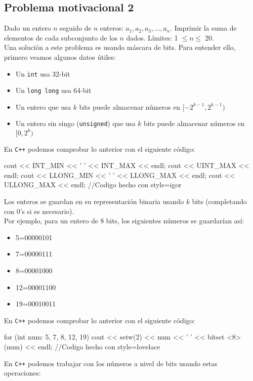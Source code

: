 \documentclass[a4paper,11pt]{article}
\begin{document}
\subsection*{Problema motivacional 2}
Dado un entero $n$ seguido de $n$ enteros: $a_{1}, a_{2}, a_{3}, \ldots, a_{n}$.$\!$ Imprimir la suma de elementos de cada subconjunto de los $n$ dados. Límites: 1 $\leq n \leq$ 20.\\[20pt]
Una solución a este problema es usando máscara de bits. Para entender ello, primero veamos algunos datos útiles:
\begin{itemize}
\item Un \texttt{int} usa 32-bit
\item Un \texttt{long long} usa 64-bit
\item Un entero que usa $k$ bits puede almacenar números en $[-2^{k-1},2^{k-1})$
\item Un entero sin singo (\texttt{unsigned}) que usa $k$ bits puede almacenar números en $[0,2^{k})$
\end{itemize}
En \texttt{C++} podemos comprobar lo anterior con el siguiente código:
\begin{pyglist}[language=c++,caption={Comprobación},listingname={\textbf{Ejemplo}},style=igor]
cout << INT_MIN << ' ' << INT_MAX << endl;
cout << UINT_MAX << endl;
cout << LLONG_MIN << ' ' << LLONG_MAX << endl;
cout << ULLONG_MAX << endl;
//Codigo hecho con style=igor
\end{pyglist}
Los enteros se guardan en su representación binaria usando $k$ bits (completando con 0's si es necesario).\\
Por ejemplo, para un entero de 8 bits, los siguientes números se guardarían así:
\begin{itemize}
\item 5=00000101
\item 7=00000111
\item 8=00001000
\item 12=00001100
\item 19=00010011
\end{itemize}
En \texttt{C++} podemos comprobar lo anterior con el siguiente código:
\begin{pyglist}[language=c++,caption={Comprobación},listingname={\textbf{Ejemplo}},style=lovelace]
for (int num: {5, 7, 8, 12, 19}) {
    cout << setw(2) << num << ' ' << bitset <8>(num) << endl;
  }
//Codigo hecho con style=lovelace
\end{pyglist}
En \texttt{C++} podemos trabajar con los números a nivel de bits usando estas operaciones:
\end{document}

